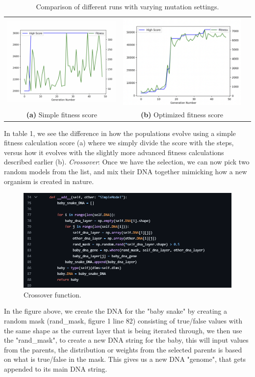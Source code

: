 \documentclass{article}
\begin{document}
\begin{table}[h!]
    \centering
    \begin{tabular}{ccc} %
        \includegraphics[width=0.3\linewidth]{simple-fitness.png} &
        \includegraphics[width=0.3\linewidth]{optimal-settings.png} \\
        \textbf{(a)} Simple fitness score  & 
        \textbf{(b)} Optimized fitness score  \\
    \end{tabular}
    \caption{Comparison of different runs with varying mutation settings.}
    \label{tab:my_label}
\end{table}
\newline
In table 1, we see the difference in how the populations evolve using a simple fitness calculation score (a) where we simply divide the score with the steps, versus how it evolves with the slightly more advanced fitness calculations described earlier (b).
\newline
\newline
\textit{Crossover}:
Once we have the selection, we can now pick two random models from the list, and mix their DNA together mimicking how a new organism is created in nature. 
\begin{figure}[h!]
    \centering
    \includegraphics[width=0.3\linewidth]{add-function.png}
    \caption{Crossover function.}
    \label{fig:enter-label}
\end{figure}
\newline
In the figure above, we create the DNA for the "baby snake" by creating a random mask (rand\_mask, figure 1 line 82) consisting of true/false values with the same shape as the current layer that is being iterated through, we then use the "rand\_mask", to create a new DNA string for the baby, this will input values from the parents, the distribution or weights from the selected parents is based on what is true/false in the mask. This gives us a new DNA "genome", that gets appended to its main DNA string.
\end{document}
